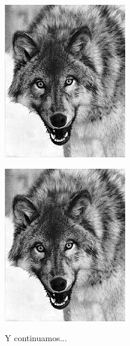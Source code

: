 \documentclass[10pt,letterpaper]{article}
\begin{document}
\\
\\
\begin{sideways}
	\includegraphics{img/canis}
\end{sideways}

\begin{turn}{30}
	\includegraphics{img/canis}
\end{turn}

Y continuamos...
\end{document}
